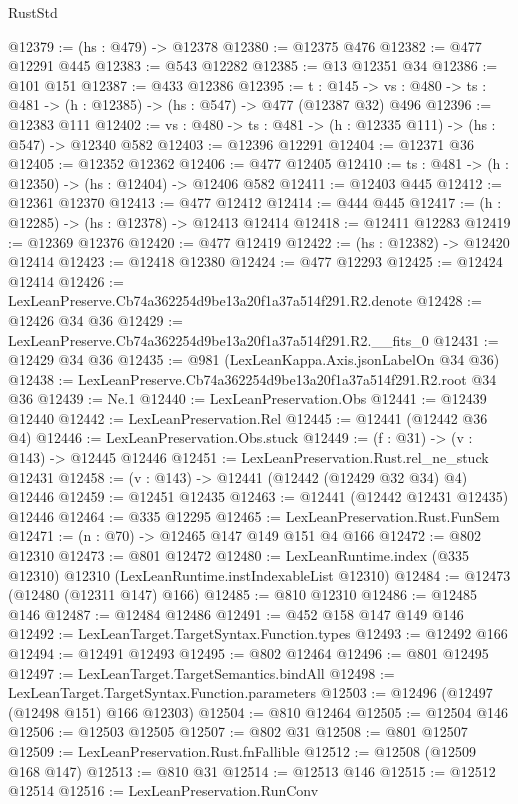\begin{lexlean}{RustStd}
\begin{coremodule}
@12379 := (hs : @479) -> @12378
@12380 := @12375 @476
@12382 := @477 @12291 @445
@12383 := @543 @12282
@12385 := @13 @12351 @34
@12386 := @101 @151
@12387 := @433 @12386
@12395 := {t : @145} ->
  {vs : @480} -> {ts : @481} -> (h : @12385) -> (hs : @547) -> @477 (@12387 @32) @496
@12396 := @12383 @111
@12402 := {vs : @480} -> {ts : @481} -> (h : @12335 @111) -> (hs : @547) -> @12340 @582
@12403 := @12396 @12291
@12404 := @12371 @36
@12405 := @12352 @12362
@12406 := @477 @12405
@12410 := {ts : @481} -> (h : @12350) -> (hs : @12404) -> @12406 @582
@12411 := @12403 @445
@12412 := @12361 @12370
@12413 := @477 @12412
@12414 := @444 @445
@12417 := (h : @12285) -> (hs : @12378) -> @12413 @12414
@12418 := @12411 @12283
@12419 := @12369 @12376
@12420 := @477 @12419
@12422 := (hs : @12382) -> @12420 @12414
@12423 := @12418 @12380
@12424 := @477 @12293
@12425 := @12424 @12414
@12426 := LexLeanPreserve.Cb74a362254d9be13a20f1a37a514f291.R2.denote
@12428 := @12426 @34 @36
@12429 := LexLeanPreserve.Cb74a362254d9be13a20f1a37a514f291.R2.__fits_0
@12431 := @12429 @34 @36
@12435 := @981 (LexLeanKappa.Axis.jsonLabelOn @34 @36)
@12438 := LexLeanPreserve.Cb74a362254d9be13a20f1a37a514f291.R2.root @34 @36
@12439 := Ne.{1}
@12440 := LexLeanPreservation.Obs
@12441 := @12439 @12440
@12442 := LexLeanPreservation.Rel
@12445 := @12441 (@12442 @36 @4)
@12446 := LexLeanPreservation.Obs.stuck
@12449 := (f : @31) -> (v : @143) -> @12445 @12446
@12451 := LexLeanPreservation.Rust.rel_ne_stuck @12431
@12458 := (v : @143) -> @12441 (@12442 (@12429 @32 @34) @4) @12446
@12459 := @12451 @12435
@12463 := @12441 (@12442 @12431 @12435) @12446
@12464 := @335 @12295
@12465 := LexLeanPreservation.Rust.FunSem
@12471 := (n : @70) -> @12465 @147 @149 @151 @4 @166
@12472 := @802 @12310
@12473 := @801 @12472
@12480 := LexLeanRuntime.index (@335 @12310) @12310 (LexLeanRuntime.instIndexableList @12310)
@12484 := @12473 (@12480 (@12311 @147) @166)
@12485 := @810 @12310
@12486 := @12485 @146
@12487 := @12484 @12486
@12491 := @452 @158 @147 @149 @146
@12492 := LexLeanTarget.TargetSyntax.Function.types
@12493 := @12492 @166
@12494 := @12491 @12493
@12495 := @802 @12464
@12496 := @801 @12495
@12497 := LexLeanTarget.TargetSemantics.bindAll
@12498 := LexLeanTarget.TargetSyntax.Function.parameters
@12503 := @12496 (@12497 (@12498 @151) @166 @12303)
@12504 := @810 @12464
@12505 := @12504 @146
@12506 := @12503 @12505
@12507 := @802 @31
@12508 := @801 @12507
@12509 := LexLeanPreservation.Rust.fnFallible
@12512 := @12508 (@12509 @168 @147)
@12513 := @810 @31
@12514 := @12513 @146
@12515 := @12512 @12514
@12516 := LexLeanPreservation.RunConv

\end{coremodule}
\end{lexlean}
